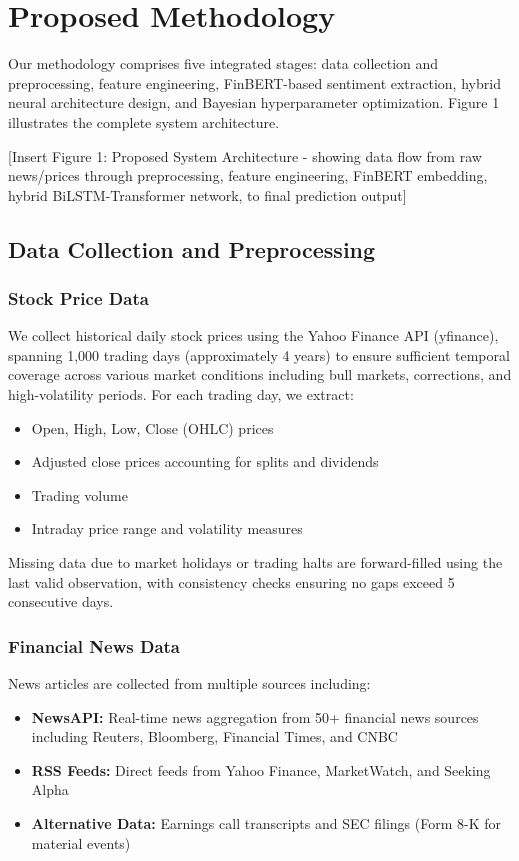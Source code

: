 \documentclass[conference]{IEEEtran}
\begin{document}
\section{Proposed Methodology}

Our methodology comprises five integrated stages: data collection and preprocessing, feature engineering, FinBERT-based sentiment extraction, hybrid neural architecture design, and Bayesian hyperparameter optimization. Figure 1 illustrates the complete system architecture.

[Insert Figure 1: Proposed System Architecture - showing data flow from raw news/prices through preprocessing, feature engineering, FinBERT embedding, hybrid BiLSTM-Transformer network, to final prediction output]

\subsection{Data Collection and Preprocessing}

\subsubsection{Stock Price Data}
We collect historical daily stock prices using the Yahoo Finance API (yfinance), spanning 1,000 trading days (approximately 4 years) to ensure sufficient temporal coverage across various market conditions including bull markets, corrections, and high-volatility periods. For each trading day, we extract:

\begin{itemize}
\item Open, High, Low, Close (OHLC) prices
\item Adjusted close prices accounting for splits and dividends
\item Trading volume
\item Intraday price range and volatility measures
\end{itemize}

Missing data due to market holidays or trading halts are forward-filled using the last valid observation, with consistency checks ensuring no gaps exceed 5 consecutive days.

\subsubsection{Financial News Data}
News articles are collected from multiple sources including:

\begin{itemize}
\item \textbf{NewsAPI:} Real-time news aggregation from 50+ financial news sources including Reuters, Bloomberg, Financial Times, and CNBC
\item \textbf{RSS Feeds:} Direct feeds from Yahoo Finance, MarketWatch, and Seeking Alpha
\item \textbf{Alternative Data:} Earnings call transcripts and SEC filings (Form 8-K for material events)
\end{itemize}
\end{document}
